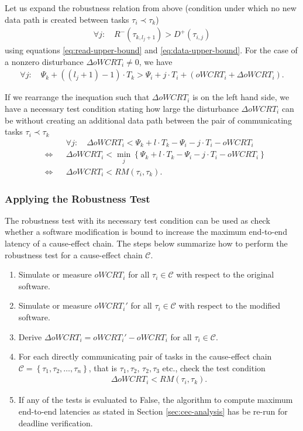Let us expand the robustness relation from above (condition under which no new data path is created between tasks  $\tau_i \prec \tau_k$) 
\begin{align}
	\forall j: \quad R^-(\tau_{k,l_j+1}) > D^+(\tau_{i,j})
\end{align}
using equations \ref{eq:read-upper-bound} and \ref{eq:data-upper-bound}.
For the case of a nonzero disturbance $\Delta oWCRT_i \neq 0$, we have
\begin{align}
	\forall j: \quad  \Psi_k + ((l_j+1)-1) \cdot T_k > \Psi_i + j \cdot T_i + (oWCRT_i + \Delta oWCRT_i).
\end{align}
\bigskip

If we rearrange the inequation such that $\Delta oWCRT_i$ is on the left hand side, we have a necessary test condition stating how large the disturbance $\Delta oWCRT_i$ can be without creating an additional data path between the pair of communicating tasks $\tau_i \prec \tau_k$
\begin{align}
	& 
	&&\forall j: \quad \Delta oWCRT_i  < \Psi_k + l \cdot T_k -  \Psi_i - j \cdot T_i  - oWCRT_i \\ 
	& \Leftrightarrow 
	&& \Delta oWCRT_i  < \min \limits_j \left\{ \Psi_k + l \cdot T_k -  \Psi_i - j \cdot T_i  - oWCRT_i \right\} \\
	& \Leftrightarrow 	
	&& \Delta oWCRT_i  < RM(\tau_i, \tau_k).
\end{align}


\subsubsection{Applying the Robustness Test} The robustness test with its necessary test condition can be used as check whether a software modification is bound to increase the maximum end-to-end latency of a cause-effect chain. 
The steps below summarize how to perform the robustness test for a cause-effect chain $\mathcal{C}$.
\begin{enumerate}
	\item Simulate or measure $oWCRT_i$ for all $\tau_i \in \mathcal{C}$ with respect to the original software.
	\item Simulate or measure $oWCRT_i'$ for all $\tau_i \in \mathcal{C}$ with respect to the modified software.
	\item Derive 
	$\Delta oWCRT_i = oWCRT_i' - oWCRT_i$ for all $\tau_i \in \mathcal{C}$.
	\item For each directly communicating pair of tasks in the cause-effect chain $\mathcal{C} = \left\{ \tau_1, \tau_2, \ldots, \tau_n \right\}$, that is $\tau_1, \tau_2$, $\tau_2, \tau_3$ etc.,  check the test condition
\begin{align}
	\Delta oWCRT_i  < RM(\tau_i, \tau_k).
\end{align}	
	\item If any of the tests is evaluated to False, the algorithm to compute maximum end-to-end latencies as stated in Section \ref{sec:cec-analysis} has be re-run for deadline verification.
\end{enumerate}


